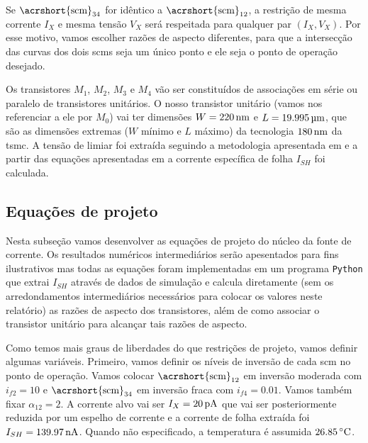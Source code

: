 \documentclass[10pt,a4paper]{extreport}
\newcommand{\?}{\stackrel{?}{=}}
\newcommand{\sis}[2]{\complexnum{#1}\,\si[per-mode=symbol]{#2}}
\begin{document}
Se $\text{\acrshort{scm}}_{34}$ for idêntico a $\text{\acrshort{scm}}_{12}$, a restrição de mesma corrente $I_X$ e mesma tensão $V_X$ será respeitada para qualquer par $(I_X,V_X)$. Por esse motivo, vamos escolher razões de aspecto diferentes, para que a intersecção das curvas dos dois \acrshort{scm}s seja um único ponto e ele seja o ponto de operação desejado.

Os transistores $M_1$, $M_2$, $M_3$ e $M_4$ vão ser constituídos de associações em série ou paralelo de transistores unitários. O nosso transistor unitário (vamos nos referenciar a ele por $M_0$) vai ter dimensões $W=\sis{220}{\nano\meter}$ e $L=\sis{19.995}{\micro\meter}$, que são as dimensões extremas ($W$ mínimo e $L$ máximo) da tecnologia $\sis{180}{\nano\meter}$ da \acrshort{tsmc}. A tensão de limiar foi extraída seguindo a metodologia apresentada em \cite{vt:extract} e a partir das equações apresentadas em \cite{acm:book} a corrente específica de folha $I_{SH}$ foi calculada.

\subsection{Equações de projeto}

Nesta subseção vamos desenvolver as equações de projeto do núcleo da fonte de corrente. Os resultados numéricos intermediários serão apesentados para fins ilustrativos mas todas as equações foram implementadas em um programa \texttt{Python} que extrai $I_{SH}$ através de dados de simulação e calcula diretamente (sem os arredondamentos intermediários necessários para colocar os valores neste relatório) as razões de aspecto dos transistores, além de como associar o transistor unitário para alcançar tais razões de aspecto.

Como temos mais graus de liberdades do que restrições de projeto, vamos definir algumas variáveis. Primeiro, vamos definir os níveis de inversão de cada \acrshort{scm} no ponto de operação. Vamos colocar $\text{\acrshort{scm}}_{12}$ em inversão moderada com $i_{f2}=10$ e $\text{\acrshort{scm}}_{34}$ em inversão fraca com $i_{f4}=\num{0.01}$. Vamos também fixar $\alpha_{12}=2$. A corrente alvo vai ser $I_X=\sis{20}{\pico\ampere}$ que vai ser posteriormente reduzida por um espelho de corrente e a corrente de folha extraída foi $I_{SH}=\sis{139.97}{\nano\ampere}$. Quando não especificado, a temperatura é assumida $\sis{26.85}{\celsius}$.
\end{document}
